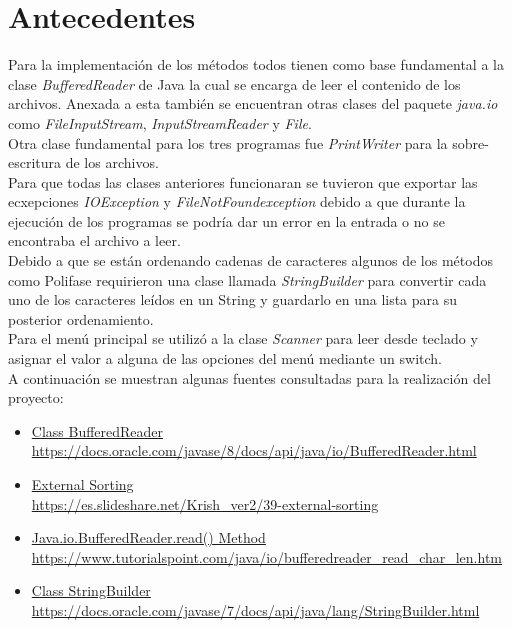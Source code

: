 \documentclass{article}
\begin{document}
	\section{Antecedentes}
	Para la implementación de los métodos todos tienen como base fundamental a la clase \textit{BufferedReader} de Java la cual se encarga de
	leer el contenido de los archivos. Anexada a esta también se encuentran otras clases del paquete \textit{java.io} como \textit{FileInputStream}, \textit{InputStreamReader}
	y \textit{File}.\\
	
	Otra clase fundamental para los tres programas fue \textit{PrintWriter} para la sobre-escritura de los archivos.\\
	
	Para que todas las clases anteriores funcionaran se tuvieron que exportar las ecxepciones \textit{IOException} y \textit{FileNotFoundexception} debido a que durante
	la ejecución de los programas se podría dar un error en la entrada o no se encontraba el archivo a leer.\\
	
	Debido a que se están ordenando cadenas de caracteres algunos de los métodos como Polifase requirieron una clase llamada \textit{StringBuilder} para convertir cada
	uno de los caracteres leídos en un String y guardarlo en una lista para su posterior ordenamiento.\\
	
	Para el menú principal se utilizó a la clase \textit{Scanner} para leer desde teclado y asignar el valor a alguna de las opciones del menú mediante un switch.\\
	
	A continuación se muestran algunas fuentes consultadas para la realización del proyecto:
	
	\begin{itemize}
		\item  \href{https://docs.oracle.com/javase/8/docs/api/java/io/BufferedReader.html}{Class BufferedReader}\\
		\url{https://docs.oracle.com/javase/8/docs/api/java/io/BufferedReader.html}
		
		\item \href{https://es.slideshare.net/Krish_ver2/39-external-sorting}{External Sorting}\\
		\url{https://es.slideshare.net/Krish_ver2/39-external-sorting}
		
		\item \href{https://www.tutorialspoint.com/java/io/bufferedreader_read_char_len.htm}{Java.io.BufferedReader.read() Method}\\
		\url{https://www.tutorialspoint.com/java/io/bufferedreader_read_char_len.htm}
		
		\item \href{https://docs.oracle.com/javase/7/docs/api/java/lang/StringBuilder.html}{Class StringBuilder}\\
		\url{https://docs.oracle.com/javase/7/docs/api/java/lang/StringBuilder.html}
	\end{itemize}
	
\end{document}
